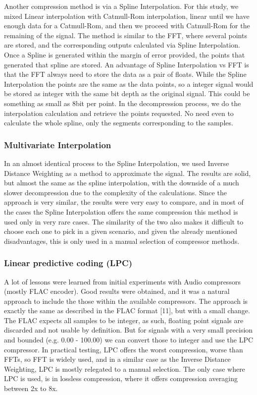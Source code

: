 \documentclass[conference]{IEEEtran}
\begin{document}
Another compression method is via a Spline Interpolation. 
For this study, we mixed Linear interpolation with Catmull-Rom interpolation, linear until we have enough data for a Catmull-Rom, and then we proceed with Catmull-Rom for the remaining of the signal.
The method is similar to the FFT, where several points are stored, and the corresponding outputs calculated via Spline Interpolation.
Once a Spline is generated within the margin of error provided, the points that generated that spline are stored.
An advantage of Spline Interpolation vs FFT is that the FFT always need to store the data as a pair of floats. 
While the Spline Interpolation the points are the same as the data points, so a integer signal would be stored as integer with the same bit depth as the original signal.
This could be something as small as 8bit per point.
In the decompression process, we do the interpolation calculation and retrieve the points requested.
No need even to calculate the whole spline, only the segments corresponding to the samples.

\subsubsection{Multivariate Interpolation}

In an almost identical process to the Spline Interpolation, we used Inverse Distance Weighting as a method to approximate the signal.
The results are solid, but almost the same as the spline interpolation, with the downside of a much slower decompression due to the complexity of the calculations.
Since the approach is very similar, the results were very easy to compare, and in most of the cases the Spline Interpolation offers the same compression this method is used only in very rare cases.
The similarity of the two also makes it difficult to choose each one to pick in a given scenario, and given the already mentioned disadvantages, this is only used in a manual selection of compressor methods.

\subsubsection{Linear predictive coding (LPC)}

A lot of lessons were learned from initial experiments with Audio compressors (mostly FLAC encoder).
Good results were obtained, and it was a natural approach to include the those within the available compressors.
The approach is exactly the same as described in the FLAC format [11], but with a small change.
The FLAC expects all samples to be integer, as such, floating point signals are discarded and not usable by definition.
But for signals with a very small precision and bounded (e.g. 0.00 - 100.00) we can convert those to integer and use the LPC compressor.
In practical testing, LPC offers the worst compression, worse than FFTs, so FFT is widely used, and in a similar case as the Inverse Distance Weighting, LPC is mostly relegated to a manual selection.
The only case where LPC is used, is in lossless compression, where it offers compression averaging between 2x to 8x.
\end{document}
